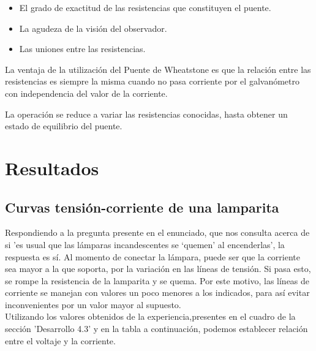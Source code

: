 \documentclass{article}
\begin{document}
\begin{itemize}
    \item El grado de exactitud de las resistencias que constituyen el puente.
    \item La agudeza de la visión del observador.
    \item Las uniones entre las resistencias.
\end{itemize}

La ventaja de la utilización del Puente de Wheatstone es que la relación entre las resistencias es siempre la misma cuando no pasa corriente por el galvanómetro con independencia del valor de la corriente.

La operación se reduce a variar las resistencias conocidas, hasta obtener un estado de equilibrio del puente.
\section{Resultados}

\subsection{Curvas tensión-corriente de una lamparita}
Respondiendo a la pregunta presente en el enunciado, que 
nos consulta acerca de si 'es usual que las lámparas 
incandescentes se `quemen' al encenderlas', la respuesta es sí. Al momento de conectar la lámpara, puede ser que la 
corriente sea mayor a la que soporta, por la variación en 
las líneas de tensión. Si pasa esto, se rompe la 
resistencia de la lamparita y se quema. Por este motivo, 
las líneas de corriente se manejan con valores un poco 
menores a los indicados, para así evitar inconvenientes por un valor mayor al supuesto.\\


Utilizando los valores obtenidos de la experiencia,presentes en el cuadro de la sección 'Desarrollo 4.3' y en la tabla a continuación, podemos establecer relación entre el voltaje y la corriente.
\end{document}
